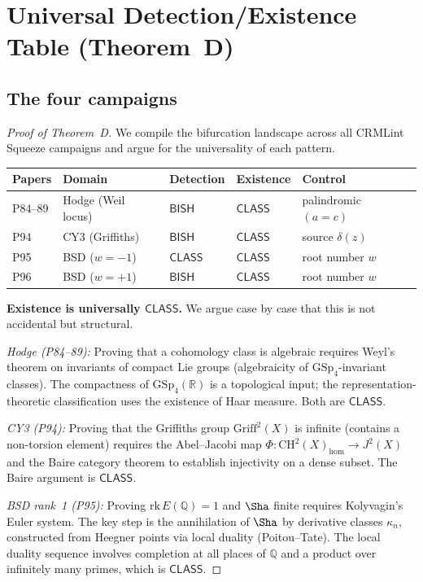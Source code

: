 \documentclass[11pt]{article}
\theoremstyle{plain}
\theoremstyle{definition}
\theoremstyle{remark}
\newcommand{\Q}{\mathbb{Q}}
\newcommand{\R}{\mathbb{R}}
\newcommand{\rk}{\mathrm{rk}}
\newcommand{\BISH}{\ensuremath{\mathsf{BISH}}}
\newcommand{\CLASS}{\ensuremath{\mathsf{CLASS}}}
\begin{document}
\section{Universal Detection/Existence Table (Theorem~D)}
\label{sec:universal}

\subsection{The four campaigns}

\begin{proof}[Proof of Theorem~D]
We compile the bifurcation landscape across all CRMLint Squeeze campaigns and argue for the universality of each pattern.

\begin{center}
\begin{tabular}{lllll}
\toprule
\textbf{Papers} & \textbf{Domain} & \textbf{Detection} & \textbf{Existence} & \textbf{Control} \\
\midrule
P84--89 & Hodge (Weil locus) & $\BISH$ & $\CLASS$ & palindromic $(a = c)$ \\
P94 & CY3 (Griffiths) & $\BISH$ & $\CLASS$ & source $\delta(z)$ \\
P95 & BSD ($w = -1$) & $\CLASS$ & $\CLASS$ & root number $w$ \\
P96 & BSD ($w = +1$) & $\BISH$ & $\CLASS$ & root number $w$ \\
\bottomrule
\end{tabular}
\end{center}

\textbf{Existence is universally $\CLASS$.} We argue case by case that this is not accidental but structural.

\emph{Hodge (P84--89):} Proving that a cohomology class is algebraic requires Weyl's theorem on invariants of compact Lie groups (algebraicity of $\mathrm{GSp}_4$-invariant classes). The compactness of $\mathrm{GSp}_4(\R)$ is a topological input; the representation-theoretic classification uses the existence of Haar measure. Both are $\CLASS$.

\emph{CY3 (P94):} Proving that the Griffiths group $\mathrm{Griff}^2(X)$ is infinite (contains a non-torsion element) requires the Abel--Jacobi map $\Phi: \mathrm{CH}^2(X)_{\mathrm{hom}} \to J^2(X)$ and the Baire category theorem to establish injectivity on a dense subset. The Baire argument is $\CLASS$.

\emph{BSD rank~1 (P95):} Proving $\rk\, E(\Q) = 1$ and $\Sha$ finite requires Kolyvagin's Euler system. The key step is the annihilation of $\Sha$ by derivative classes $\kappa_n$, constructed from Heegner points via local duality (Poitou--Tate). The local duality sequence involves completion at all places of $\Q$ and a product over infinitely many primes, which is $\CLASS$.


\end{proof}
\end{document}
